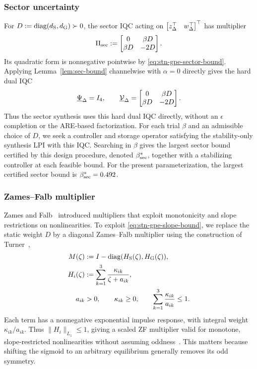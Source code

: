 \subsubsection{Sector uncertainty}
For $D:=\operatorname{diag}(d_{{\mathrm{S}}},d_{{\mathrm{G}}})\succ0$, the sector
IQC acting on $\begin{bmatrix}z_\Delta^\top&w_\Delta^\top\end{bmatrix}^\top$ has multiplier
\begin{equation}\label{eq:stn-gpe-sector-multiplier}
\Pi_{{\mathrm{sec}}}:=\begin{bmatrix}0&\beta D\\\beta D&-2D\end{bmatrix}.
\end{equation}
Its quadratic form is nonnegative pointwise by
\eqref{eq:stn-gpe-sector-bound}. Applying Lemma~\ref{lem:sec-bound}
channelwise with $\alpha=0$ directly gives the hard dual IQC
\begin{equation*}
\underline{\Psi}_\Delta=I_4,
\qquad
\underline{\mathcal{V}}_\Delta=\begin{bmatrix}0&\beta D\\\beta D&-2D\end{bmatrix}.
\end{equation*}
Thus the sector synthesis uses this hard dual IQC directly, without an
$\epsilon$ completion or the ARE-based factorization. For each trial
$\beta$ and an admissible choice of $D$, we seek a controller and storage
operator satisfying the stability-only synthesis LPI with this IQC.
Searching in $\beta$ gives the
largest sector bound certified by this design procedure, denoted
$\beta_{{\mathrm{sec}}}^*$, together with a stabilizing controller at each
feasible bound.
For the present parameterization, the largest certified sector bound is
$\beta_{{\mathrm{sec}}}^*=0.492$.

\subsubsection{Zames--Falb multiplier}
Zames and Falb~\cite{zames1968stability} introduced multipliers that exploit
monotonicity and slope restrictions on nonlinearities. To exploit
\eqref{eq:stn-gpe-slope-bound}, we replace the static weight $D$ by a diagonal
Zames--Falb multiplier using the construction of
Turner~\cite{turner2022zamesfalbmultipliersdontpanic},
\begin{equation}\label{eq:stn-gpe-zf-transfer}
\begin{aligned}
M(\zeta)&:=I-\operatorname{diag}(H_{{\mathrm{S}}}(\zeta),H_{{\mathrm{G}}}(\zeta)),\\
H_i(\zeta)&:=\sum_{k=1}^{3}\frac{\kappa_{ik}}{\zeta+a_{ik}},\\
a_{ik}&>0,\qquad\kappa_{ik}\geq0,\qquad
\sum_{k=1}^{3}\frac{\kappa_{ik}}{a_{ik}}\leq1.
\end{aligned}
\end{equation}
Each term has a nonnegative exponential impulse response, with integral
weight $\kappa_{ik}/a_{ik}$. Thus $\|H_i\|_{L_1}\leq 1$, giving a scaled ZF multiplier
valid for monotone, slope-restricted nonlinearities without assuming
oddness~\cite[Thm.~4]{turner2022zamesfalbmultipliersdontpanic}.
This matters because shifting the sigmoid to an arbitrary equilibrium
generally removes its odd symmetry.


